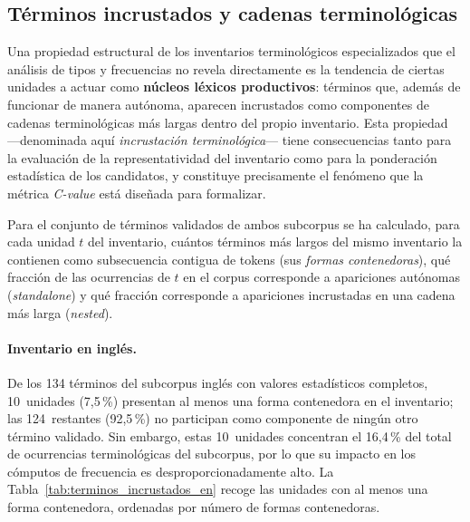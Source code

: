 
\subsection{Términos incrustados y cadenas terminológicas}
\label{subsec:terminos_incrustados}

Una propiedad estructural de los inventarios terminológicos especializados que el análisis de tipos y frecuencias no revela directamente es la tendencia de ciertas unidades a actuar como \textbf{núcleos léxicos productivos}: términos que, además de funcionar de manera autónoma, aparecen incrustados como componentes de cadenas terminológicas más largas dentro del propio inventario. Esta propiedad ---denominada aquí \textit{incrustación terminológica}--- tiene consecuencias tanto para la evaluación de la representatividad del inventario como para la ponderación estadística de los candidatos, y constituye precisamente el fenómeno que la métrica \textit{C-value} está diseñada para formalizar.

Para el conjunto de términos validados de ambos subcorpus se ha calculado, para cada unidad $t$ del inventario, cuántos términos más largos del mismo inventario la contienen como subsecuencia contigua de tokens (sus \emph{formas contenedoras}), qué fracción de las ocurrencias de $t$ en el corpus corresponde a apariciones autónomas (\emph{standalone}) y qué fracción corresponde a apariciones incrustadas en una cadena más larga (\emph{nested}).

\paragraph{Inventario en inglés.}
De los 134 términos del subcorpus inglés con valores estadísticos completos, 10~unidades (7,5\,\%) presentan al menos una forma contenedora en el inventario; las 124~restantes (92,5\,\%) no participan como componente de ningún otro término validado. Sin embargo, estas 10~unidades concentran el 16,4\,\% del total de ocurrencias terminológicas del subcorpus, por lo que su impacto en los cómputos de frecuencia es desproporcionadamente alto. La Tabla~\ref{tab:terminos_incrustados_en} recoge las unidades con al menos una forma contenedora, ordenadas por número de formas contenedoras.

